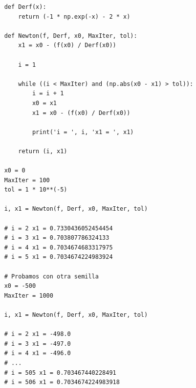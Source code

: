 \begin{verbatim}
    def Derf(x):
        return (-1 * np.exp(-x) - 2 * x)
        
    def Newton(f, Derf, x0, MaxIter, tol):
        x1 = x0 - (f(x0) / Derf(x0))
        
        i = 1
        
        while ((i < MaxIter) and (np.abs(x0 - x1) > tol)):
            i = i + 1
            x0 = x1
            x1 = x0 - (f(x0) / Derf(x0))
            
            print('i = ', i, 'x1 = ', x1)
            
        return (i, x1)
        
    x0 = 0
    MaxIter = 100
    tol = 1 * 10**(-5)
    
    i, x1 = Newton(f, Derf, x0, MaxIter, tol)
    
    # i = 2 x1 = 0.7330436052454454
    # i = 3 x1 = 0.703807786324133
    # i = 4 x1 = 0.7034674683317975
    # i = 5 x1 = 0.7034674224983924
    
    # Probamos con otra semilla
    x0 = -500
    MaxIter = 1000
    
    i, x1 = Newton(f, Derf, x0, MaxIter, tol)

    # i = 2 x1 = -498.0
    # i = 3 x1 = -497.0
    # i = 4 x1 = -496.0
    # ...
    # i = 505 x1 = 0.703467440228491
    # i = 506 x1 = 0.7034674224983918
\end{verbatim}